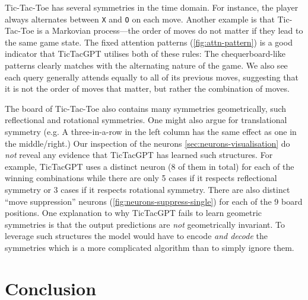 \documentclass{article}
\newcommand{\ttgpt}{TicTacGPT\xspace}
\newcommand{\ttt}{Tic-Tac-Toe\xspace}
\begin{document}
\ttt has several symmetries in the time domain. For instance, the player always alternates between \texttt{X} and \texttt{O} on each move. Another example is that \ttt is a Markovian process---the order of moves do not matter if they lead to the same game state. The fixed attention patterns (\cref{fig:attn-pattern}) is a good indicator that \ttgpt utilises both of these rules: The chequerboard-like patterns clearly matches with the alternating nature of the game. We also see each query generally attends equally to all of its previous moves, suggesting that it is not the order of moves that matter, but rather the combination of moves.

The board of \ttt also contains many symmetries geometrically, such reflectional and rotational symmetries. One might also argue for translational symmetry (e.g. A three-in-a-row in the left column has the same effect as one in the middle/right.) Our inspection of the neurons \cref{sec:neurons-visualisation} do \emph{not} reveal any evidence that \ttgpt has learned such structures. For example, \ttgpt uses a distinct neuron (8 of them in total) for each of the winning combinations while there are only 5 cases if it respects reflectional symmetry or 3 cases if it respects rotational symmetry. There are also distinct ``move suppression'' neurons (\cref{fig:neurons-suppress-single}) for each of the 9 board positions. One explanation to why \ttgpt fails to learn geometric symmetries is that the output predictions are \emph{not} geometrically invariant. To leverage such structures the model would have to encode \emph{and decode} the symmetries which is a more complicated algorithm than to simply ignore them.

\section{Conclusion}

\newpage


\end{document}
